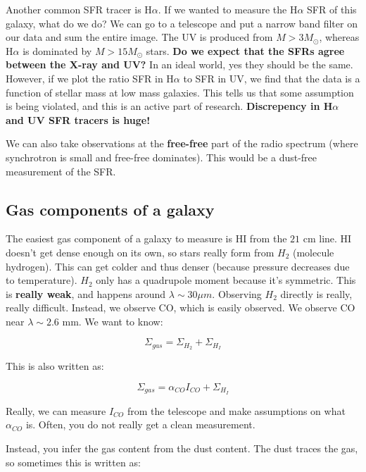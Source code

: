 \documentclass{article}
\begin{document}
Another common SFR tracer is H$\alpha$. If we wanted to measure the H$\alpha$ SFR of this galaxy, what do we do? We can go to a telescope and put a narrow band filter on our data and sum the entire image. The UV is produced from $M>3M_\odot$, whereas H$\alpha$ is dominated by $M>15M_\odot$ stars. \textbf{Do we expect that the SFRs agree between the X-ray and UV?} In an ideal world, yes they should be the same. However, if we plot the ratio SFR in H$\alpha$ to SFR in UV, we find that the data is a function of stellar mass at low mass galaxies. This tells us that some assumption is being violated, and this is an active part of research. \textbf{Discrepency in H$\alpha$ and UV SFR tracers is huge!}

We can also take observations at the \textbf{free-free} part of the radio spectrum (where synchrotron is small and free-free dominates). This would be a dust-free measurement of the SFR. 

\subsection{Gas components of a galaxy}

The easiest gas component of a galaxy to measure is HI from the $21$ cm line. HI doesn't get dense enough on its own, so stars really form from $H_2$ (molecule hydrogen). This can get colder and thus denser (because pressure decreases due to temperature). $H_2$ only has a quadrupole moment because it's symmetric. This is \textbf{really weak}, and happens around $\lambda \sim 30 \mu m$. Observing $H_2$ directly is really, really difficult. Instead, we observe CO, which is easily observed. We observe CO near $\lambda \sim 2.6$ mm. We want to know:

\begin{equation}
    \Sigma_{gas} = \Sigma_{H_2} + \Sigma_{H_I} 
\end{equation}

This is also written as:

\begin{equation}
    \Sigma_{gas} = \alpha_{CO} I_{CO} + \Sigma_{H_I}
\end{equation}

Really, we can measure $I_{CO}$ from the telescope and make assumptions on what $\alpha_{CO}$ is. Often, you do not really get a clean measurement.

Instead, you infer the gas content from the dust content. The dust traces the gas, so sometimes this is written as:
\end{document}

